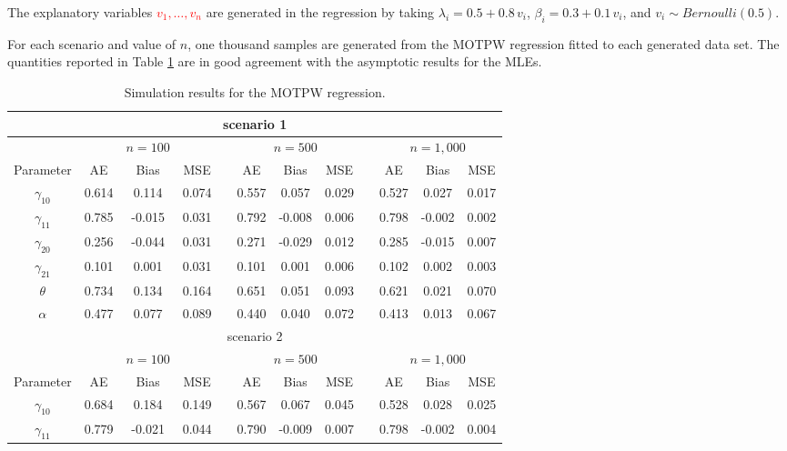 \documentclass[12pt]{article}
\begin{document}
The explanatory variables \textcolor{red}{$v_{1},\ldots,v_{n}$} are generated in the
regression by taking $\lambda_{i} = 0.5 + 0.8\, v_{i}$, $\beta_{i} = 0.3 +0.1\, v_{i}$,
and $v_{i} \sim Bernoulli(0.5)$.

For each scenario and value of $n$, one thousand samples are generated from the MOTPW regression fitted to each generated data set.
The quantities reported in Table \ref{simula:regre} are in good agreement with the asymptotic results for the MLEs.

\begin{table}[htb!]
\small \centering \caption{Simulation results for the MOTPW regression.} \label{simula:regre} {\small
\begin{tabular}{cccccccccccc}
\hline
\multicolumn{ 12}{c}{scenario 1} \\
\hline &  & \multicolumn{1}{c}{$n=100$} &       &
& \multicolumn{3}{c}{$n=500$}  &  &\multicolumn{3}{c}{$n=1,000$}
\\ \cline{2-4} \cline{6-8} \cline{10-12}
Parameter & AE &  Bias  & MSE   &    & AE    &  Bias   & MSE &       & AE & Bias    & MSE \\
\hline
$\gamma_{10}$ &0.614    &0.114   &0.074& &0.557    &0.057   &0.029&  &0.527    &0.027   &0.017\\
$\gamma_{11}$&0.785   &-0.015   &0.031& &0.792   &-0.008   &0.006& &0.798   &-0.002   &0.002\\
				
$\gamma_{20}$ &0.256   &-0.044   &0.031& &0.271   &-0.029   &0.012&  &0.285   &-0.015   &0.007\\
$\gamma_{21}$&0.101    &0.001   &0.031& &0.101    &0.001   &0.006& &0.102    &0.002   &0.003\\
			
$\theta$   &0.734    &0.134   &0.164& &0.651    &0.051   &0.093& &0.621    &0.021   &0.070\\
$\alpha$   &0.477    &0.077   &0.089& &0.440  &0.040  &0.072 & &0.413    &0.013   &0.067\\
\hline
\multicolumn{ 12}{c}{scenario 2} \\
\hline &  & \multicolumn{1}{c}{$n=100$} &       &
& \multicolumn{3}{c}{$n=500$}  &  &\multicolumn{3}{c}{$n=1,000$}
\\ \cline{2-4} \cline{6-8} \cline{10-12}
Parameter    & AE &  Bias  & MSE   &    & AE    &  Bias   & MSE &       & AE & Bias    & MSE \\
\hline
$\gamma_{10}$ &0.684   &0.184  &0.149& &0.567  &0.067  &0.045&  &0.528  &0.028  &0.025\\
$\gamma_{11}$ &0.779   &-0.021 &0.044& &0.790  &-0.009 &0.007&  &0.798  &-0.002 &0.004\\
				

\end{tabular}}
\end{table}
\end{document}
